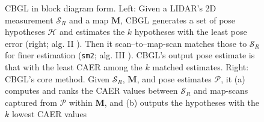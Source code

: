 \begin{figure}\vspace{-0.4cm}
  \subfloat{\label{fig:cbgl}     }
  \subfloat{\label{fig:bottom_k} }
  \caption{\small CBGL in block diagram form. Left: Given a LIDAR's 2D
           measurement $\mathcal{S}_R$ and a map $\bm{M}$, CBGL generates a set
           of pose hypotheses $\mathcal{H}$ and estimates the $k$ hypotheses
           with the least pose error (right; alg.
           II \cite{Filotheou2023c}). Then it scan--to--map-scan matches those
           to $\mathcal{S}_R$ for finer estimation (\texttt{sm2}; alg.
           III \cite{Filotheou2023c}). CBGL's output pose estimate is
           that with the least CAER among the $k$ matched estimates.  Right:
           CBGL's core method. Given $\mathcal{S}_R$, $\bm{M}$, and pose
           estimates $\mathcal{P}$, it (a) computes and ranks the CAER values
           between $\mathcal{S}_R$ and map-scans captured from $\mathcal{P}$
           within $\bm{M}$, and (b) outputs the hypotheses with the $k$ lowest
           CAER values}
\vspace{-0.5cm}
  \label{fig:block_system}
\end{figure}



